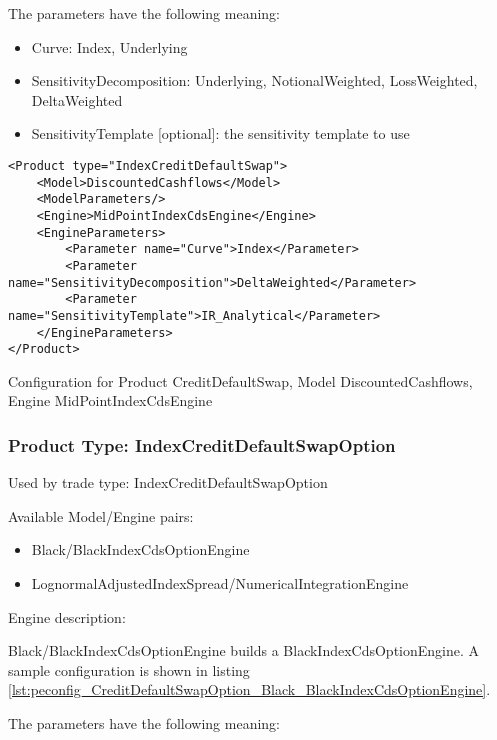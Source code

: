 The parameters have the following meaning:

\begin{itemize}
\item Curve: Index, Underlying
\item SensitivityDecomposition: Underlying, NotionalWeighted, LossWeighted, DeltaWeighted
\item SensitivityTemplate [optional]: the sensitivity template to use 
\end{itemize}

\begin{longlisting}
\begin{verbatim}
<Product type="IndexCreditDefaultSwap">
    <Model>DiscountedCashflows</Model>
    <ModelParameters/>
    <Engine>MidPointIndexCdsEngine</Engine>
    <EngineParameters>
        <Parameter name="Curve">Index</Parameter>
        <Parameter name="SensitivityDecomposition">DeltaWeighted</Parameter>
        <Parameter name="SensitivityTemplate">IR_Analytical</Parameter>
    </EngineParameters>
</Product>
\end{verbatim}
\caption{Configuration for Product CreditDefaultSwap, Model DiscountedCashflows, Engine MidPointIndexCdsEngine}
\label{lst:peconfig_CreditDefaultSwap_DiscountedCashflows_MidPointIndexCdsEngine}
\end{longlisting}

\subsubsection{Product Type: IndexCreditDefaultSwapOption}

Used by trade type: IndexCreditDefaultSwapOption

Available Model/Engine pairs:

\begin{itemize}
\item Black/BlackIndexCdsOptionEngine
\item LognormalAdjustedIndexSpread/NumericalIntegrationEngine
\end{itemize}

Engine description:

Black/BlackIndexCdsOptionEngine builds a BlackIndexCdsOptionEngine. A sample configuration is shown in listing
\ref{lst:peconfig_CreditDefaultSwapOption_Black_BlackIndexCdsOptionEngine}.

The parameters have the following meaning:


